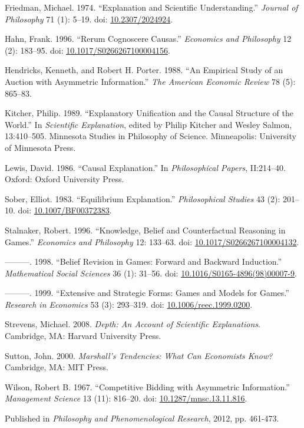\documentclass[
  11pt,
  letterpaper,
  DIV=11,
  numbers=noendperiod,
  twoside]{scrartcl}
\newlength{\cslhangindent}
\newenvironment{CSLReferences}[2] %
 {\begin{list}{}{%
  \setlength{\itemindent}{0pt}
  \setlength{\leftmargin}{0pt}
  \setlength{\parsep}{0pt}
  \ifodd #1
   \setlength{\leftmargin}{\cslhangindent}
   \setlength{\itemindent}{-1\cslhangindent}
  \fi
  \setlength{\itemsep}{#2\baselineskip}}}
 {\end{list}}
\begin{document}
\label{refs}
\begin{CSLReferences}{1}{0}
Friedman, Michael. 1974. {``Explanation and Scientific Understanding.''}
\emph{Journal of Philosophy} 71 (1): 5--19. doi:
\href{https://doi.org/10.2307/2024924}{10.2307/2024924}.

Hahn, Frank. 1996. {``Rerum Cognoscere Causas.''} \emph{Economics and
Philosophy} 12 (2): 183--95. doi:
\href{https://doi.org/10.1017/S0266267100004156}{10.1017/S0266267100004156}.

Hendricks, Kenneth, and Robert H. Porter. 1988. {``An Empirical Study of
an Auction with Asymmetric Information.''} \emph{The American Economic
Review} 78 (5): 865--83.

Kitcher, Philip. 1989. {``Explanatory Unification and the Causal
Structure of the World.''} In \emph{Scientific Explanation}, edited by
Philip Kitcher and Wesley Salmon, 13:410--505. Minnesota Studies in
Philosophy of Science. Minneapolis: University of Minnesota Press.

Lewis, David. 1986. {``Causal Explanation.''} In \emph{Philosophical
Papers}, II:214--40. Oxford: Oxford University Press.

Sober, Elliot. 1983. {``Equilibrium Explanation.''} \emph{Philosophical
Studies} 43 (2): 201--10. doi:
\href{https://doi.org/10.1007/BF00372383}{10.1007/BF00372383}.

Stalnaker, Robert. 1996. {``Knowledge, Belief and Counterfactual
Reasoning in Games.''} \emph{Economics and Philosophy} 12: 133--63. doi:
\href{https://doi.org/10.1017/S0266267100004132}{10.1017/S0266267100004132}.

---------. 1998. {``Belief Revision in Games: Forward and Backward
Induction.''} \emph{Mathematical Social Sciences} 36 (1): 31--56. doi:
\href{https://doi.org/10.1016/S0165-4896(98)00007-9}{10.1016/S0165-4896(98)00007-9}.

---------. 1999. {``Extensive and Strategic Forms: Games and Models for
Games.''} \emph{Research in Economics} 53 (3): 293--319. doi:
\href{https://doi.org/10.1006/reec.1999.0200}{10.1006/reec.1999.0200}.

Strevens, Michael. 2008. \emph{Depth: An Account of Scientific
Explanations}. Cambridge, MA: Harvard University Press.

Sutton, John. 2000. \emph{Marshall's Tendencies: What Can Economists
Know?} Cambridge, MA: {MIT} Press.

Wilson, Robert B. 1967. {``Competitive Bidding with Asymmetric
Information.''} \emph{Management Science} 13 (11): 816--20. doi:
\href{https://doi.org/10.1287/mnsc.13.11.816}{10.1287/mnsc.13.11.816}.

\end{CSLReferences}



\noindent Published in\emph{
Philosophy and Phenomenological Research}, 2012, pp. 461-473.
\end{document}
